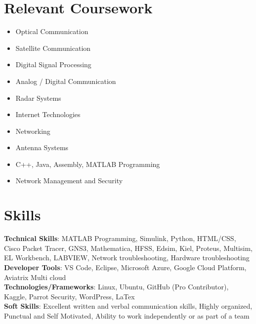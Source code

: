 \documentclass[letterpaper,11pt]{article}
\newcommand{\resumeSubHeadingListStart}{\begin{itemize}[leftmargin=0.0in, label={}]}
\newcommand{\resumeSubHeadingListEnd}{\end{itemize}}
\begin{document}
\section{Relevant Coursework}
        \begin{multicols}{4}
            \begin{itemize}[itemsep=-5pt, parsep=3pt]
                \item\small Optical Communication
                \item Satellite Communication
                \item Digital Signal Processing
                \item Analog / Digital Communication
                \item Radar Systems 
                \item Internet Technologies
                \item Networking
                \item Antenna Systems
                \item C++, Java, Assembly, MATLAB Programming
                \item Network Management and Security
            \end{itemize}
        \end{multicols}
        \vspace*{2.0\multicolsep}


\section{Skills}
 \begin{itemize}[leftmargin=0.15in, label={}]
    \small{\item{
     \textbf{Technical Skills}{: MATLAB Programming, Simulink, Python, HTML/CSS, Cisco Packet Tracer, GNS3, Mathematica, HFSS, Edsim, Kiel, Proteus, Multisim, EL Workbench, LABVIEW, Network troubleshooting, Hardware troubleshooting} \\
     \textbf{Developer Tools}{: VS Code, Eclipse, Microsoft Azure, Google Cloud Platform, Aviatrix Multi cloud} \\
     \textbf{Technologies/Frameworks}{: Linux, Ubuntu, GitHub (Pro Contributor), Kaggle, Parrot Security, WordPress, LaTex} \\
     \textbf{Soft Skills}{: Excellent written and verbal communication skills, Highly organized, Punctual and Self Motivated, Ability to work independently or as part of a team} \\
    }}
 \end{itemize}
 \vspace{-16pt}
\end{document}
